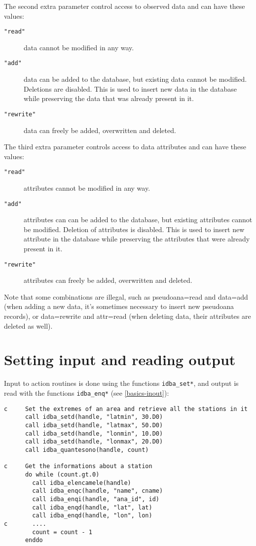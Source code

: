 \documentclass[draft,12pt,a4paper,twoside]{book}
\begin{document}
The second extra parameter control access to observed data and can have
these values:

\begin{description}
\item[{\tt "read"}] data cannot be modified in any way.
\item[{\tt "add"}] data can be added to the database, but existing data cannot
		   be modified.  Deletions are disabled.  This is used to
		   insert new data in the database while preserving the data
		   that was already present in it.
\item[{\tt "rewrite"}] data can freely be added, overwritten and deleted.
\end{description}

The third extra parameter controls access to data attributes and can have
these values:

\begin{description}
\item[{\tt "read"}] attributes cannot be modified in any way.
\item[{\tt "add"}] attributes can can be added to the database, but existing
		   attributes cannot be modified.  Deletion of attributes is
		   disabled.  This is used to insert new attribute in the
		   database while preserving the attributes that were already
		   present in it.
\item[{\tt "rewrite"}] attributes can freely be added, overwritten and deleted.
\end{description}

Note that some combinations are illegal, such as pseudoana=read and data=add
(when adding a new data, it's sometimes necessary to insert new pseudoana
records), or data=rewrite and attr=read (when deleting data, their attributes
are deleted as well).


\section{Setting input and reading output}

Input to action routines is done using the functions {\tt idba\_set*}, and output
is read with the functions {\tt idba\_enq*} (see \ref{basics-inout}):

\begin{verbatim}
c     Set the extremes of an area and retrieve all the stations in it
      call idba_setd(handle, "latmin", 30.D0)
      call idba_setd(handle, "latmax", 50.D0)
      call idba_setd(handle, "lonmin", 10.D0)
      call idba_setd(handle, "lonmax", 20.D0)
      call idba_quantesono(handle, count)
   
c     Get the informations about a station
      do while (count.gt.0)
        call idba_elencamele(handle)
        call idba_enqc(handle, "name", cname)
        call idba_enqi(handle, "ana_id", id)
        call idba_enqd(handle, "lat", lat)
        call idba_enqd(handle, "lon", lon)
c       ....
        count = count - 1
      enddo
\end{verbatim}
\end{document}
